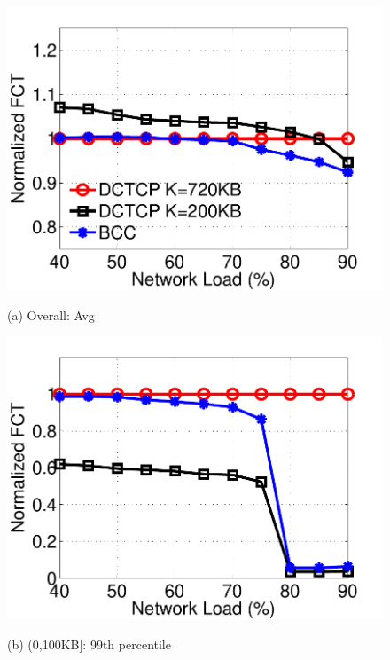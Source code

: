\begin{figure}[t]
\centering
\begin{minipage}{0.245\linewidth}
   \includegraphics[width=1\linewidth]{figs/websearch_overall_avg_fct.pdf}
   \centerline{(a) Overall: Avg}
\end{minipage}
\begin{minipage}{0.245\linewidth}
   \includegraphics[width=1\linewidth]{figs/websearch_small_tail_fct.pdf}
   \centerline{(b) (0,100KB]: 99th percentile}
\end{minipage}
\begin{minipage}{0.245\linewidth}

\end{minipage}
\end{figure}

